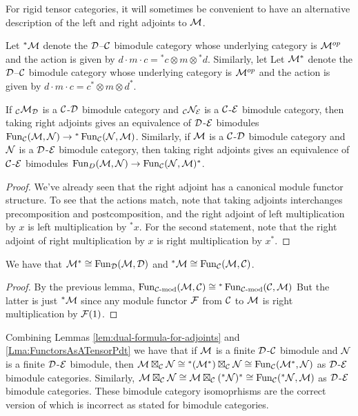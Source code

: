 \documentclass{amsart}
\begin{document}
For rigid tensor categories, it will sometimes be convenient to have an alternative description of the left and right adjoints to $\mathcal M$.

\begin{definition}
Let ${}^*\mathcal M$ denote the $\mathcal D$--$\mathcal C$ bimodule category whose underlying category is $\mathcal M^{{op}}$ and the action is given by $d\cdot m \cdot c = {}^*c \otimes m \otimes {}^*d$.  Similarly, let Let $\mathcal M^*$ denote the $\mathcal D$--$\mathcal C$ bimodule category whose underlying category is $\mathcal M^{{op}}$ and the action is given by $d\cdot m \cdot c = c^* \otimes m \otimes d^*$.  
\end{definition}

\begin{lemma}
If ${}_{\mathcal C}\mathcal M_\mathcal D$ is a $\mathcal C$-$\mathcal D$ bimodule category and ${}_{\mathcal C}\mathcal N_\mathcal E$ is a $\mathcal C$-$\mathcal E$ bimodule category, then taking right adjoints gives an equivalence of $\mathcal D$-$\mathcal E$ bimodules $\operatorname{Fun}_{\mathcal C}(\mathcal M, \mathcal N) \rightarrow {}^*\operatorname{Fun}_{\mathcal C}(\mathcal N, \mathcal M)$.  Similarly, if $\mathcal M$ is a $\mathcal C$-$\mathcal D$ bimodule category and $\mathcal N$ is a $\mathcal D$-$\mathcal E$ bimodule category, then taking right adjoints gives an equivalence of $\mathcal C$-$\mathcal E$ bimodules $\operatorname{Fun}_{D}(\mathcal M, \mathcal N) \rightarrow \operatorname{Fun}_{\mathcal C}(\mathcal N, \mathcal M)^*$. 
\end{lemma}
\begin{proof}
We've already seen that the right adjoint has a canonical module functor structure.  To see that the actions match, note that taking adjoints interchanges precomposition and postcomposition, and the right adjoint of left multiplication by $x$ is left multiplication by ${}^*x$.  For the second statement, note that the right adjoint of right multiplication by $x$ is right multiplication by $x^*$.
\end{proof}

\begin{lemma} \label{lem:dual-formula-for-adjoints}
We have that $\mathcal M^* \cong \operatorname{Fun}_{\mathcal D}(\mathcal M, \mathcal D)$ and ${}^*\mathcal M \cong \operatorname{Fun}_{\mathcal C}(\mathcal M, \mathcal C)$.
\end{lemma}
\begin{proof}
By the previous lemma, $\operatorname{Fun}_{\mathcal C\text{-mod}}(\mathcal M, \mathcal C) \cong {}^*\operatorname{Fun}_{\mathcal C\text{-mod}}(\mathcal C, \mathcal M)$  But the latter is just ${}^*\mathcal M$ since any module functor $\mathcal F$ from $\mathcal C$ to $\mathcal M$ is right multiplication by $\mathcal F(1)$.
\end{proof}

\begin{remark}
Combining Lemmas \ref{lem:dual-formula-for-adjoints} and \ref{Lma:FunctorsAsATensorPdt} we have that if $\mathcal M$ is a finite $\mathcal D$-$\mathcal C$ bimodule and $\mathcal N$ is a finite $\mathcal D$-$\mathcal E$ bimodule, then $\mathcal M \boxtimes_\mathcal C \mathcal N \cong {}^*(\mathcal M^*) \boxtimes_\mathcal C \mathcal N \cong \operatorname{Fun}_{\mathcal C}(\mathcal M^*,\mathcal N)$ as $\mathcal D$-$\mathcal E$ bimodule categories.   Similarly, $\mathcal M \boxtimes_\mathcal C \mathcal N \cong \mathcal M \boxtimes_\mathcal C ({}^*\mathcal N)^* \cong \operatorname{Fun}_{\mathcal C}({}^*\mathcal N,\mathcal M)$ as $\mathcal D$-$\mathcal E$ bimodule categories.  These bimodule category isomoprhisms are the correct version of \cite{???} 
which is incorrect as stated for bimodule categories.
\end{remark}
\end{document}
